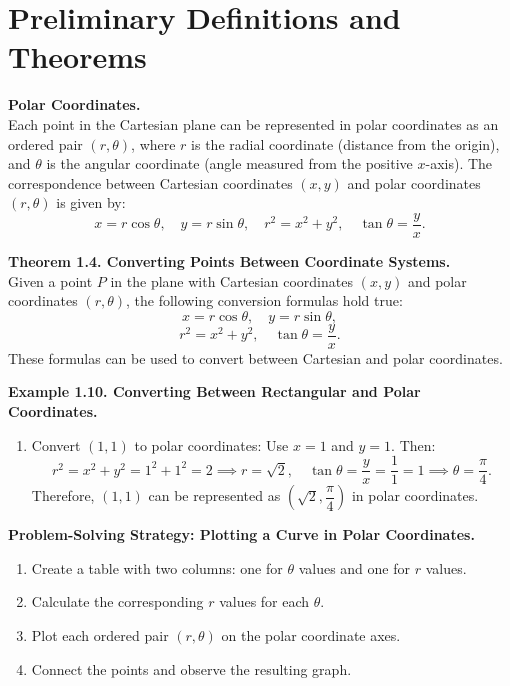 \documentclass{article}
\begin{document}
\renewcommand{\familydefault}{\rmdefault}




\section*{Preliminary Definitions and Theorems}

\begin{definitionbox}
\textbf{Polar Coordinates.} \\
Each point in the Cartesian plane can be represented in polar coordinates as an ordered pair $(r, \theta)$, where $r$ is the radial coordinate (distance from the origin), and $\theta$ is the angular coordinate (angle measured from the positive $x$-axis).  
The correspondence between Cartesian coordinates $(x, y)$ and polar coordinates $(r, \theta)$ is given by:
\[
x = r\cos\theta, \quad y = r\sin\theta, \quad r^2 = x^2 + y^2, \quad \tan\theta = \frac{y}{x}.
\]
\end{definitionbox}

\begin{theorembox}
\textbf{Theorem 1.4. Converting Points Between Coordinate Systems.} \\
Given a point $P$ in the plane with Cartesian coordinates $(x, y)$ and polar coordinates $(r, \theta)$, the following conversion formulas hold true:
\[
x = r\cos\theta, \quad y = r\sin\theta,
\]
\[
r^2 = x^2 + y^2, \quad \tan\theta = \frac{y}{x}.
\]
These formulas can be used to convert between Cartesian and polar coordinates.
\end{theorembox}

\begin{examplebox}
\textbf{Example 1.10. Converting Between Rectangular and Polar Coordinates.}
\begin{enumerate}
    \item Convert $(1, 1)$ to polar coordinates:  
    Use $x = 1$ and $y = 1$. Then:
    \[
    r^2 = x^2 + y^2 = 1^2 + 1^2 = 2 \implies r = \sqrt{2}, \quad \tan\theta = \frac{y}{x} = \frac{1}{1} = 1 \implies \theta = \frac{\pi}{4}.
    \]
    Therefore, $(1, 1)$ can be represented as $(\sqrt{2}, \dfrac{\pi}{4})$ in polar coordinates.
\end{enumerate}
\end{examplebox}

\begin{conceptbox}
\textbf{Problem-Solving Strategy: Plotting a Curve in Polar Coordinates.}
\begin{enumerate}
    \item Create a table with two columns: one for $\theta$ values and one for $r$ values.
    \item Calculate the corresponding $r$ values for each $\theta$.
    \item Plot each ordered pair $(r, \theta)$ on the polar coordinate axes.
    \item Connect the points and observe the resulting graph.
\end{enumerate}
\end{conceptbox}
\end{document}
